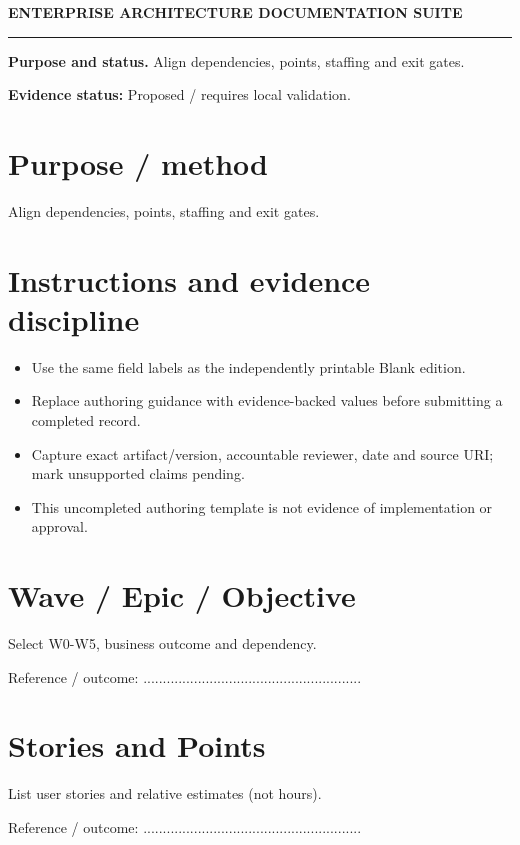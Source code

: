 \documentclass[10pt,letterpaper]{article}
\begin{document}
\begin{center}
{\large\bfseries\color{teal} ENTERPRISE ARCHITECTURE DOCUMENTATION SUITE}\par
{}\par
{}\par
\end{center}
\vspace{8pt}\hrule\vspace{12pt}
\textbf{Purpose and status.} Align dependencies, points, staffing and exit gates.\par
\textbf{Evidence status:} Proposed / requires local validation.\par
\section{Purpose / method}
Align dependencies, points, staffing and exit gates.\par
\section{Instructions and evidence discipline}
\begin{itemize}
\item Use the same field labels as the independently printable Blank edition.
\item Replace authoring guidance with evidence-backed values before submitting a completed record.
\item Capture exact artifact/version, accountable reviewer, date and source URI; mark unsupported claims pending.
\item This uncompleted authoring template is not evidence of implementation or approval.
\end{itemize}
\section{Wave / Epic / Objective}
Select W0-W5, business outcome and dependency.\par
Reference / outcome: ........................................................\par
\section{Stories and Points}
List user stories and relative estimates (not hours).\par
Reference / outcome: ........................................................\par
\end{document}
